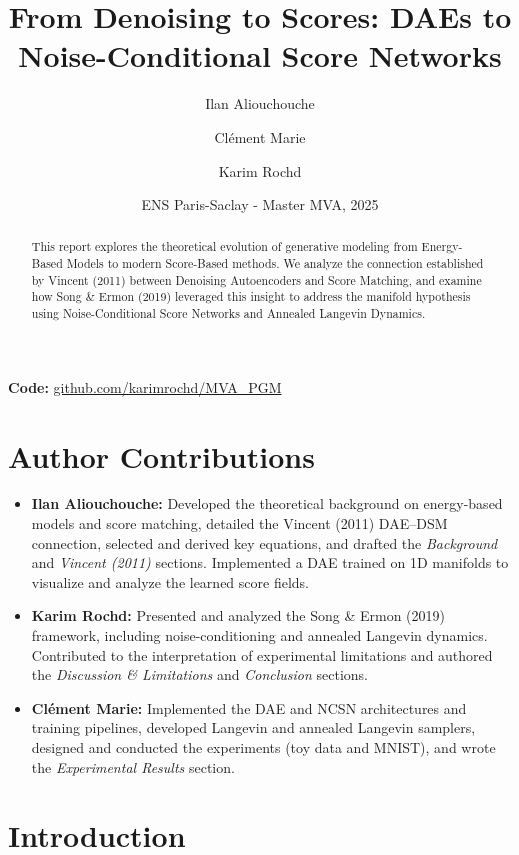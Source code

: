 \documentclass[11pt,a4paper]{article}
\title{\textbf{From Denoising to Scores: DAEs to Noise-Conditional Score Networks}}
\author{Ilan Aliouchouche \and Clément Marie \and Karim Rochd}
\date{ENS Paris-Saclay - Master MVA, 2025}
\begin{document}
\maketitle

\begin{abstract}
This report explores the theoretical evolution of generative modeling from Energy-Based Models to modern Score-Based methods. We analyze the connection established by Vincent (2011) between Denoising Autoencoders and Score Matching, and examine how Song \& Ermon (2019) leveraged this insight to address the manifold hypothesis using Noise-Conditional Score Networks and Annealed Langevin Dynamics.
\end{abstract}

\begin{center}
\small
\textbf{Code:} \href{https://github.com/karimrochd/MVA_PGM/tree/main}{github.com/karimrochd/MVA\_PGM}
\end{center}
\vspace{0.5em}

\section*{Author Contributions}
\begin{itemize}[noitemsep,leftmargin=*]
  \item \textbf{Ilan Aliouchouche:} Developed the theoretical background on energy-based models and score matching, detailed the Vincent (2011) DAE–DSM connection, selected and derived key equations, and drafted the \emph{Background} and \emph{Vincent (2011)} sections. Implemented a DAE trained on 1D manifolds to visualize and analyze the learned score fields.
  \item \textbf{Karim Rochd:} Presented and analyzed the Song \& Ermon (2019) framework, including noise-conditioning and annealed Langevin dynamics. Contributed to the interpretation of experimental limitations and authored the \emph{Discussion \& Limitations} and \emph{Conclusion} sections.
  \item \textbf{Clément Marie:} Implemented the DAE and NCSN architectures and training pipelines, developed Langevin and annealed Langevin samplers, designed and conducted the experiments (toy data and MNIST), and wrote the \emph{Experimental Results} section.
\end{itemize}

\section{Introduction}
\end{document}
